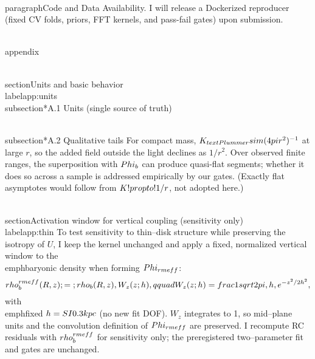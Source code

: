 \documentclass[11pt,a4paper]{article}
\begin{document}
\\paragraph{Code and Data Availability.}
I will release a Dockerized reproducer (fixed CV folds, priors, FFT kernels, and pass-fail gates) upon submission.

\\appendix

\\section{Units and basic behavior}\\label{app:units}
\\subsection*{A.1 Units (single source of truth)}

\\subsection*{A.2 Qualitative tails}
For compact mass, $K_{\\text{Plummer}}\\sim (4\\pi r^2)^{-1}$ at large $r$, so the added field outside the light declines as $1/r^2$. Over observed finite ranges, the superposition with $\\Phi_b$ can produce quasi-flat segments; whether it does so across a sample is addressed empirically by our gates. (Exactly flat asymptotes would follow from $K\\!\\propto\\!1/r$, not adopted here.)

\\section{Activation window for vertical coupling (sensitivity only)}\\label{app:thin}
To test sensitivity to thin–disk structure while preserving the isotropy of $U$, I keep the kernel unchanged and apply a fixed, normalized vertical window to the \\emph{baryonic density} when forming $\\Phi_{\\rm eff}$:
\[
\\rho_b^{\\rm eff}(R,z) \\;=\\; \\rho_b(R,z)\\,W_z(z;h),
\\qquad
W_z(z;h)=\\frac{1}{\\sqrt{2\\pi}\\,h}\\,e^{-z^2/2h^2},
\]
with \\emph{fixed} $h=\\SI{0.3}{\\kpc}$ (no new fit DOF). $W_z$ integrates to 1, so mid–plane units and the convolution definition of $\\Phi_{\\rm eff}$ are preserved. I recompute RC residuals with $\\rho_b^{\\rm eff}$ for sensitivity only; the preregistered two–parameter fit and gates are unchanged.
\end{document}

